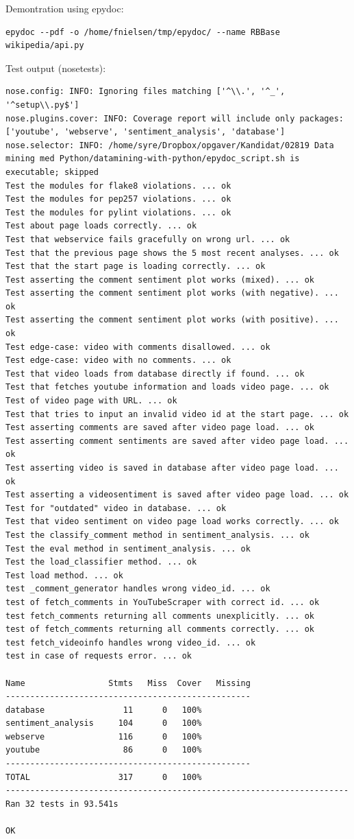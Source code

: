 \documentclass[conference]{IEEEtran}
\begin{document}
Demontration using epydoc:
\begin{verbatim}
epydoc --pdf -o /home/fnielsen/tmp/epydoc/ --name RBBase wikipedia/api.py
\end{verbatim}
Test output (nosetests): 
\begin{verbatim}
nose.config: INFO: Ignoring files matching ['^\\.', '^_', '^setup\\.py$']
nose.plugins.cover: INFO: Coverage report will include only packages: ['youtube', 'webserve', 'sentiment_analysis', 'database']
nose.selector: INFO: /home/syre/Dropbox/opgaver/Kandidat/02819 Data mining med Python/datamining-with-python/epydoc_script.sh is executable; skipped
Test the modules for flake8 violations. ... ok
Test the modules for pep257 violations. ... ok
Test the modules for pylint violations. ... ok
Test about page loads correctly. ... ok
Test that webservice fails gracefully on wrong url. ... ok
Test that the previous page shows the 5 most recent analyses. ... ok
Test that the start page is loading correctly. ... ok
Test asserting the comment sentiment plot works (mixed). ... ok
Test asserting the comment sentiment plot works (with negative). ... ok
Test asserting the comment sentiment plot works (with positive). ... ok
Test edge-case: video with comments disallowed. ... ok
Test edge-case: video with no comments. ... ok
Test that video loads from database directly if found. ... ok
Test that fetches youtube information and loads video page. ... ok
Test of video page with URL. ... ok
Test that tries to input an invalid video id at the start page. ... ok
Test asserting comments are saved after video page load. ... ok
Test asserting comment sentiments are saved after video page load. ... ok
Test asserting video is saved in database after video page load. ... ok
Test asserting a videosentiment is saved after video page load. ... ok
Test for "outdated" video in database. ... ok
Test that video sentiment on video page load works correctly. ... ok
Test the classify_comment method in sentiment_analysis. ... ok
Test the eval method in sentiment_analysis. ... ok
Test the load_classifier method. ... ok
Test load method. ... ok
test _comment_generator handles wrong video_id. ... ok
test of fetch_comments in YouTubeScraper with correct id. ... ok
test fetch_comments returning all comments unexplicitly. ... ok
test of fetch_comments returning all comments correctly. ... ok
test fetch_videoinfo handles wrong video_id. ... ok
test in case of requests error. ... ok

Name                 Stmts   Miss  Cover   Missing
--------------------------------------------------
database                11      0   100%   
sentiment_analysis     104      0   100%   
webserve               116      0   100%   
youtube                 86      0   100%   
--------------------------------------------------
TOTAL                  317      0   100%   
----------------------------------------------------------------------
Ran 32 tests in 93.541s

OK

\end{verbatim}
%
\end{document}
